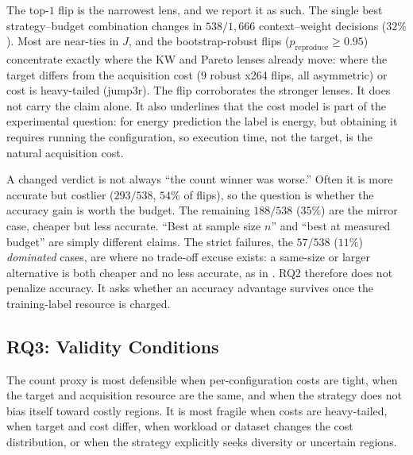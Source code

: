 The top-$1$ flip is the narrowest lens, and we report it as such. The single
best strategy--budget combination changes in $538/1{,}666$ context--weight
decisions ($32\%$). Most are near-ties in $J$, and the bootstrap-robust flips
($p_{\text{reproduce}}\ge0.95$) concentrate exactly where the KW and Pareto
lenses already move: where the target differs from the acquisition cost ($9$
robust x264 flips, all asymmetric) or cost is heavy-tailed (\StudyEnergy jump3r).
The flip corroborates the stronger lenses. It does not carry the claim alone. It
also underlines that the cost model is part of the experimental question: for
energy prediction the label is energy, but obtaining it requires running the
configuration, so execution time, not the target, is the natural acquisition
cost.

A changed verdict is not always ``the count winner was worse.'' Often it is more
accurate but costlier ($293/538$, $54\%$ of flips), so the question is whether
the accuracy gain is worth the budget. The remaining $188/538$ ($35\%$) are the
mirror case, cheaper but less accurate. ``Best at sample size $n$'' and ``best at
measured budget'' are simply different claims. The strict failures, the
$57/538$ ($11\%$) \emph{dominated} cases, are where no trade-off excuse exists:
a same-size or larger alternative is both cheaper and no less accurate, as in
. RQ2 therefore does not penalize accuracy. It asks
whether an accuracy advantage survives once the training-label resource is
charged.


\subsection{RQ3: Validity Conditions}
\label{subsec:results-rq3}

The count proxy is most defensible when per-configuration costs are tight, when
the target and acquisition resource are the same, and when the strategy does
not bias itself toward costly regions. It is most fragile when costs are
heavy-tailed, when target and cost differ, when workload or dataset changes the
cost distribution, or when the strategy explicitly seeks diversity or uncertain
regions.

